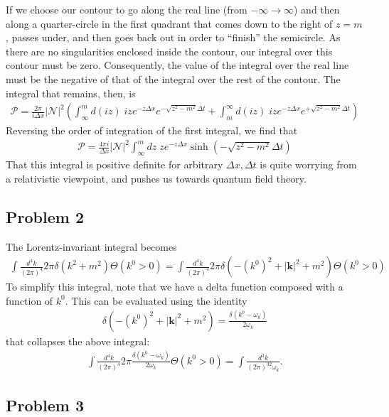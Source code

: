 \documentclass{mathnotes}
\begin{document}
If we choose our contour to go along the real line (from $-\infty\to\infty$) and then along a quarter-circle in the first quadrant that comes down to the right of $z=m$, passes
under, and then goes back out in order to ``finish'' the semicircle. As there are no singularities enclosed inside the contour, our integral over this contour must be zero.
Consequently, the value of the integral over the real line must be the negative of that of the integral over the rest of the contour. The integral that remains, then, is
\begin{align*}
    \mathcal{P}=\frac{2\pi}{i\Delta x}|\mathcal{N}|^2\left(\int_\infty^m d(iz)\; iz e^{-z\Delta x}e^{-\sqrt{z^2-m^2}\Delta t}+
    \int_m^{\infty} d(iz)\; iz e^{-z\Delta x}e^{+\sqrt{z^2-m^2}\Delta t}\right)
\end{align*}
Reversing the order of integration of the first integral, we find that 
\begin{align*}
    \mathcal{P}=\frac{4\pi i}{\Delta x}|\mathcal{N}|^2\int_\infty^m dz\; z e^{-z\Delta x}\sinh\left(-\sqrt{z^2-m^2}\Delta t\right)
\end{align*}
That this integral is positive definite for arbitrary $\Delta x,\Delta t$ is quite worrying from a relativistic viewpoint, and pushes us towards quantum field theory.

\subsection*{Problem 2}

The Lorentz-invariant integral becomes
\begin{align*}
    \int \frac{d^4k}{(2\pi)^4}2\pi\delta\left( k^2+m^2 \right)\Theta\left( k^0>0 \right)=\int \frac{d^4k}{(2\pi)^4}2\pi\delta\left(-(k^0)^2+|\mathbf{k}|^2+m^2 \right)\Theta\left( k^0>0 \right)
\end{align*}
To simplify this integral, note that we have a delta function composed with a function of $k^0$. This can be evaluated using the identity
\begin{align*}
    \delta\left(-(k^0)^2+|\mathbf{k}|^2+m^2\right)=\frac{\delta\left( k^0-\omega_k\right)}{2\omega_k}
\end{align*}
that collapses the above integral:
\begin{align*}
    \int\frac{d^4k}{(2\pi)^4}2\pi\frac{\delta(k^0-\omega_k)}{2\omega_k}\Theta(k^0>0)=\int\frac{d^3k}{(2\pi)^32\omega_k}.
\end{align*}

\subsection*{Problem 3}
\end{document}
